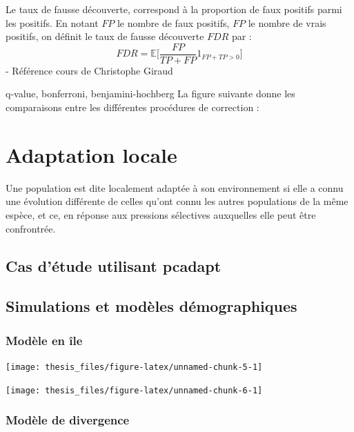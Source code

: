 \documentclass[12pt,twoside]{reedthesis}
\begin{document}
  Le taux de fausse découverte, correspond à la proportion de faux
  positifs parmi les positifs. En notant \(FP\) le nombre de faux
  positifs, \(FP\) le nombre de vrais positifs, on définit le taux de
  fausse découverte \(FDR\) par :
  \[ FDR = \mathbb{E}\Big[\frac{FP}{TP + FP} 1_{FP+TP > 0}\Big] \] -
  Référence cours de Christophe Giraud
  
  q-value, bonferroni, benjamini-hochberg La figure suivante donne les
  comparaisons entre les différentes procédures de correction :
  
  \chapter{Adaptation locale}\label{adaptation-locale-1}
  
  Une population est dite localement adaptée à son environnement si elle a
  connu une évolution différente de celles qu'ont connu les autres
  populations de la même espèce, et ce, en réponse aux pressions
  sélectives auxquelles elle peut être confrontrée.
  
  \section{Cas d'étude utilisant
  pcadapt}\label{cas-detude-utilisant-pcadapt}
  
  \section{Simulations et modèles
  démographiques}\label{simulations-et-modeles-demographiques}
  
  \subsection{Modèle en île}\label{modele-en-ile}
  
  \begin{center}\texttt{[image: thesis\_files/figure-latex/unnamed-chunk-5-1]} \end{center}
  
  \begin{center}\texttt{[image: thesis\_files/figure-latex/unnamed-chunk-6-1]} \end{center}
  
  \subsection{Modèle de divergence}\label{modele-de-divergence}
  
\end{document}
